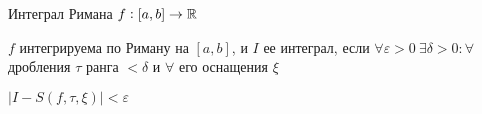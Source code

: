 \documentclass[12pt]{article}
\begin{document}
\begin{defin}{Интеграл Римана}
    $f : [a, b] \to \mathbb R$

    $f$ интегрируема по Риману на $[a, b]$, и $I$ ее интеграл, если $\forall \varepsilon > 0\ \exists \delta > 0 : \forall$ дробления $\tau$ ранга $< \delta$ и $\forall$ его оснащения $\xi$

    $|I - S(f, \tau, \xi)| < \varepsilon$
\end{defin}
\end{document}
